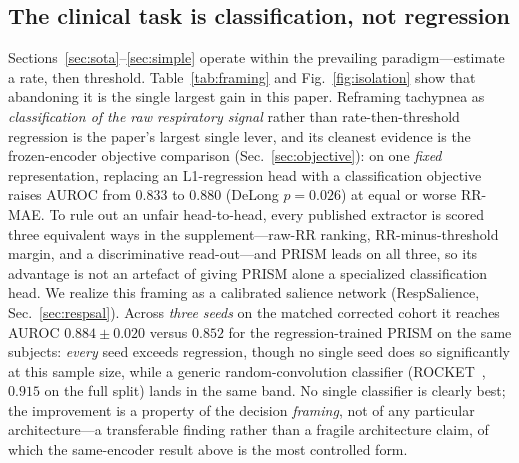 \documentclass[journal]{IEEEtran}
\begin{document}
\subsection{The clinical task is classification, not regression}\label{sec:framing}
Sections~\ref{sec:sota}--\ref{sec:simple} operate within the prevailing paradigm---estimate a rate, then
threshold. Table~\ref{tab:framing} and Fig.~\ref{fig:isolation} show that abandoning it is the single largest gain in
this paper.
Reframing tachypnea as \emph{classification of the raw respiratory signal} rather than
rate-then-threshold regression is the paper's largest single lever, and its cleanest evidence is the
frozen-encoder objective comparison (Sec.~\ref{sec:objective}): on one \emph{fixed} representation,
replacing an L1-regression head with a classification objective raises AUROC from $0.833$ to $0.880$
(DeLong $p=0.026$) at equal or worse RR-MAE.
To rule out an unfair head-to-head, every published extractor is scored three equivalent ways in the
supplement---raw-RR ranking, RR-minus-threshold margin, and a discriminative read-out---and PRISM leads on
all three, so its advantage is not an artefact of giving PRISM alone a specialized classification head.
We realize this framing as a calibrated salience network (RespSalience, Sec.~\ref{sec:respsal}). Across
\emph{three seeds} on the matched corrected cohort it reaches AUROC $0.884{\pm}0.020$
versus $0.852$ for the regression-trained PRISM on the same
subjects: \emph{every} seed exceeds regression, though no single seed does so significantly at this
sample size, while a generic random-convolution classifier (ROCKET~\cite{rocket}, $0.915$
on the full split) lands in the same band. No single classifier is clearly best; the improvement is a
property of the decision \emph{framing}, not of any particular architecture---a transferable finding rather
than a fragile architecture claim, of which the same-encoder result above is the most controlled form.
\end{document}
